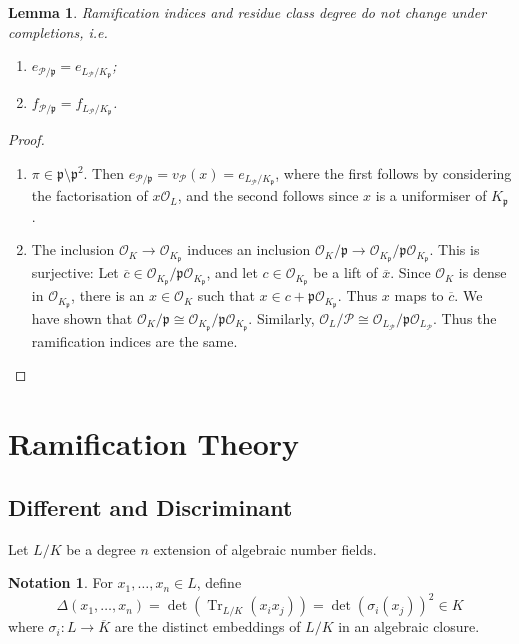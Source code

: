 \documentclass[11pt]{article}
\theoremstyle{definition}
\newtheorem*{notation}{Notation}
\theoremstyle{plain}
\newtheorem*{lemma*}{Lemma}
\theoremstyle{remark}
\DeclareMathOperator{\Tr}{Tr}
\newcommand{\cO}{\mathcal{O}}
\newcommand{\cP}{\mathcal{P}}
\newcommand{\fp}{\mathfrak{p}}
\begin{document}
\begin{lemma*}
    Ramification indices and residue class degree do not change under completions, i.e.
    \begin{enumerate}
        \item $e_{\cP / \fp} = e_{L_\cP / K_\fp}$;
        \item $f_{\cP / \fp} = f_{L_\cP / K_\fp}$.
    \end{enumerate}
\end{lemma*}
\begin{proof}\phantom{}
    \begin{enumerate}
        \item $\pi \in \fp \setminus \fp^2$. Then $e_{\cP / \fp} =v_\cP(x) = e_{L_\cP / K_\fp}$, where the first follows by considering the factorisation of $x \cO_L$, and the second follows since $x$ is a uniformiser of $K_\fp$.

        \item The inclusion $\cO_K \to \cO_{K_\fp}$ induces an inclusion $\cO_K / \fp \to \cO_{K_\fp} / \fp \cO_{K_\fp}$. This is surjective: Let $\overline{c} \in \cO_{K_\fp} / \fp\cO_{K_\fp}$, and let $c \in \cO_{K_\fp}$ be a lift of $\overline{x}$. Since $\cO_K$ is dense in $\cO_{K_\fp}$, there is an $x \in \cO_K$ such that $x \in c + \fp \cO_{K_\fp}$. Thus $x$ maps to $\overline{c}$. We have shown that $\cO_K / \fp \cong \cO_{K_\fp} / \fp \cO_{K_\fp}$. Similarly, $\cO_L / \cP \cong \cO_{L_\cP} / \fp \cO_{L_\cP}$. Thus the ramification indices are the same. \qedhere
    \end{enumerate}
\end{proof}

\section{Ramification Theory}

\subsection{Different and Discriminant}

Let $L / K$ be a degree $n$ extension of algebraic number fields.

\begin{notation}
    For $x_1, \ldots, x_n \in L$, define
    \begin{equation*}
        \Delta(x_1, \ldots, x_n) = \det(\Tr_{L/K}(x_i x_j)) = \det(\sigma_i(x_j))^2 \in K
    \end{equation*}
    where $\sigma_i : L \to \overline{K}$ are the distinct embeddings of $L/K$ in an algebraic closure.
\end{notation}
\end{document}
